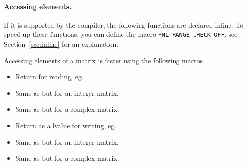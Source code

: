 \paragraph{Accessing elements.}

If it is supported by the compiler, the following functions are declared
inline. To speed up these functions, you can define the macro 
\texttt{PNL_RANGE_CHECK_OFF}, see Section~\ref{sec:inline} for an explanation. 

Accessing elements of a matrix is faster using the following macros
\begin{itemize}
  \item {}
  \sshortdescribe Return  for reading, eg. 
\item {}
  \sshortdescribe Same as  but for an integer matrix.
\item {}
  \sshortdescribe Same as  but for a complex matrix.
\item {}
  \sshortdescribe Return  as a lvalue for writing, eg.
\item {}
  \sshortdescribe Same as  but for an integer matrix.
\item {}
  \sshortdescribe Same as  but for a complex matrix.
\end{itemize}

